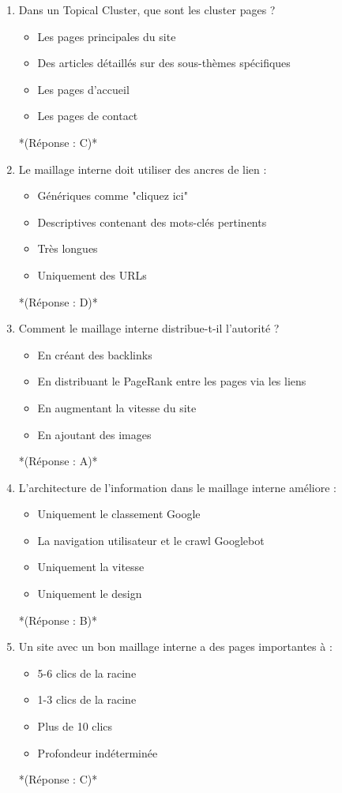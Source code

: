 \documentclass[12pt,a4paper,twoside]{report}
\begin{document}
\begin{enumerate}
\item Dans un Topical Cluster, que sont les cluster pages ?
\begin{itemize}
\item[A)] Les pages principales du site
\item[B)] Des articles détaillés sur des sous-thèmes spécifiques
\item[C)] Les pages d'accueil
\item[D)] Les pages de contact
\end{itemize}
*(Réponse : C)*

\item Le maillage interne doit utiliser des ancres de lien :
\begin{itemize}
\item[A)] Génériques comme "cliquez ici"
\item[B)] Descriptives contenant des mots-clés pertinents
\item[C)] Très longues
\item[D)] Uniquement des URLs
\end{itemize}
*(Réponse : D)*

\item Comment le maillage interne distribue-t-il l'autorité ?
\begin{itemize}
\item[A)] En créant des backlinks
\item[B)] En distribuant le PageRank entre les pages via les liens
\item[C)] En augmentant la vitesse du site
\item[D)] En ajoutant des images
\end{itemize}
*(Réponse : A)*

\item L'architecture de l'information dans le maillage interne améliore :
\begin{itemize}
\item[A)] Uniquement le classement Google
\item[B)] La navigation utilisateur et le crawl Googlebot
\item[C)] Uniquement la vitesse
\item[D)] Uniquement le design
\end{itemize}
*(Réponse : B)*

\item Un site avec un bon maillage interne a des pages importantes à :
\begin{itemize}
\item[A)] 5-6 clics de la racine
\item[B)] 1-3 clics de la racine
\item[C)] Plus de 10 clics
\item[D)] Profondeur indéterminée
\end{itemize}
*(Réponse : C)*


\end{enumerate}
\end{document}
